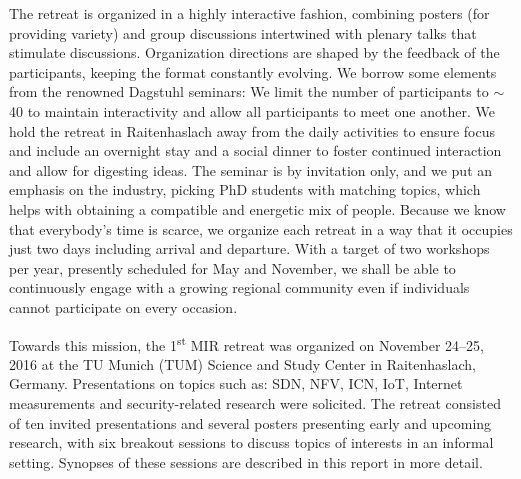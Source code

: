 The retreat is organized in a highly interactive fashion, combining posters
(for providing variety) and group discussions intertwined with plenary talks
that stimulate discussions.  Organization directions are shaped by the
feedback of the participants, keeping the format constantly evolving.  We
borrow some elements from the renowned Dagstuhl seminars: We limit the number
of participants to $\sim$40 to maintain interactivity and allow all
participants to meet one another.  We hold the retreat in Raitenhaslach away
from the daily activities to ensure focus and include an overnight stay and a
social dinner to foster continued interaction and allow for digesting ideas.
The seminar is by invitation only, and we put an emphasis on the industry,
picking PhD students with matching topics, which helps with obtaining a
compatible and energetic mix of people. Because we know that everybody's time
is scarce, we organize each retreat in a way that it occupies just two days
including arrival and departure.  With a target of two workshops per year,
presently scheduled for May and November, we shall be able to continuously
engage with a growing regional community even if individuals cannot
participate on every occasion.

Towards this mission, the 1\textsuperscript{st} \ac{MIR} retreat was organized
on November 24--25, 2016 at the TU Munich (TUM) Science and Study Center in
Raitenhaslach, Germany. Presentations on topics such as: \ac{SDN}, \ac{NFV},
\ac{ICN}, \ac{IoT}, Internet measurements and security-related research were
solicited.  The retreat consisted of ten invited presentations and several
posters presenting early and upcoming research, with six breakout sessions to
discuss topics of interests in an informal setting. Synopses of these sessions
are described in this report in more detail.
